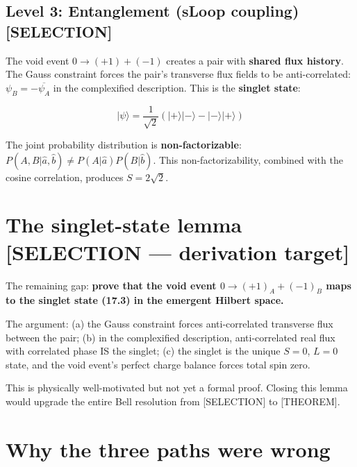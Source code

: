 \documentclass[
  11pt,
  letterpaper,
  twoside,
  openany]{book}
\makeatletter
\let\orig@section\section
\renewcommand{\section}{\needspace{8\baselineskip}\orig@section}
\let\orig@subsection\subsection
\renewcommand{\subsection}{\needspace{6\baselineskip}\orig@subsection}
\makeatother
\begin{document}
\subsection{Level 3: Entanglement (sLoop coupling)
{[}SELECTION{]}}\label{level-3-entanglement-sloop-coupling-selection}

The void event \(0 \to (+1) + (-1)\) creates a pair with \textbf{shared
flux history}. The Gauss constraint forces the pair's transverse flux
fields to be anti-correlated: \(\psi_B = -\overline{\psi_A}\) in the
complexified description. This is the \textbf{singlet state}:

\[
|\psi\rangle = \frac{1}{\sqrt{2}}\left(|+\rangle|-\rangle - |-\rangle|+\rangle\right)
\tag{17.3}
\]

The joint probability distribution is \textbf{non-factorizable}:
\(P(A, B | \hat{a}, \hat{b}) \neq P(A | \hat{a}) P(B | \hat{b})\). This
non-factorizability, combined with the cosine correlation, produces
\(S = 2\sqrt{2}\).

\section{The singlet-state lemma {[}SELECTION --- derivation
target{]}}\label{the-singlet-state-lemma-selection-derivation-target}

\begin{ftdselection}

The remaining gap: \textbf{prove that the void event
\(0 \to (+1)_A + (-1)_B\) maps to the singlet state (17.3) in the
emergent Hilbert space.}

The argument: (a) the Gauss constraint forces anti-correlated transverse
flux between the pair; (b) in the complexified description,
anti-correlated real flux with correlated phase IS the singlet; (c) the
singlet is the unique \(S = 0\), \(L = 0\) state, and the void event's
perfect charge balance forces total spin zero.

This is physically well-motivated but not yet a formal proof. Closing
this lemma would upgrade the entire Bell resolution from {[}SELECTION{]}
to {[}THEOREM{]}.

\end{ftdselection}

\section{Why the three paths were
wrong}\label{why-the-three-paths-were-wrong}
\end{document}
